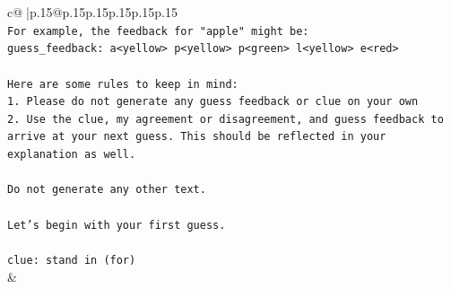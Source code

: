 \documentclass{article}
\begin{document}
{\begin{supertabular}{c@{$\;$}|p{.15\linewidth}@{}p{.15\linewidth}p{.15\linewidth}p{.15\linewidth}p{.15\linewidth}p{.15\linewidth}}
{{{\\ 
\texttt{For example, the feedback for "apple" might be:} \\
\texttt{guess\_feedback: a<yellow> p<yellow> p<green> l<yellow> e<red>} \\
\\ 
\texttt{Here are some rules to keep in mind:} \\
\texttt{1. Please do not generate any guess feedback or clue on your own} \\
\texttt{2. Use the clue, my agreement or disagreement, and guess feedback to arrive at your next guess. This should be reflected in your explanation as well.} \\
\\ 
\texttt{Do not generate any other text.} \\
\\ 
\texttt{Let's begin with your first guess.} \\
\\ 
\texttt{clue: stand in (for)} \\
            }
        }
    }
    & \\ \\


\end{supertabular}}
\end{document}
